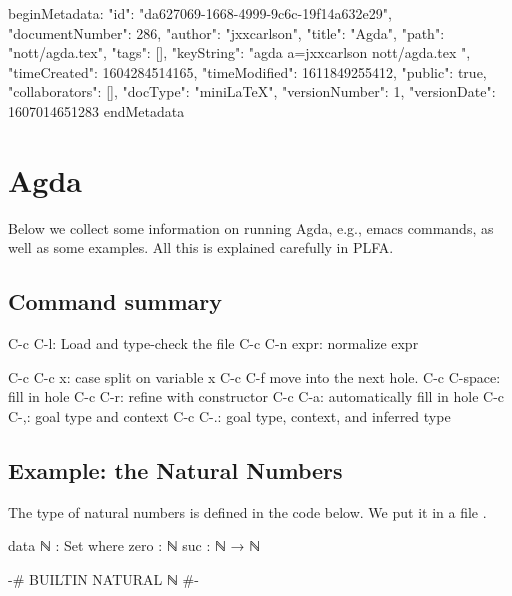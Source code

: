 beginMetadata:
{
    "id": "da627069-1668-4999-9c6c-19f14a632e29",
    "documentNumber": 286,
    "author": "jxxcarlson",
    "title": "Agda",
    "path": "nott/agda.tex",
    "tags": [],
    "keyString": "agda a=jxxcarlson nott/agda.tex ",
    "timeCreated": 1604284514165,
    "timeModified": 1611849255412,
    "public": true,
    "collaborators": [],
    "docType": "miniLaTeX",
    "versionNumber": 1,
    "versionDate": 1607014651283
}
endMetadata



\setcounter{section}{3}

\section{Agda}

\innertableofcontents



Below we collect some information on running Agda, e.g., emacs commands, as well as some examples.  All this is explained carefully in PLFA.

\subsection{Command summary}

\begin{colored}[bash]
C-c C-l: Load and type-check the file
C-c C-n expr: normalize expr

C-c C-c x: case split on variable x
C-c C-f move into the next hole.
C-c C-space: fill in hole
C-c C-r: refine with constructor
C-c C-a: automatically fill in hole
C-c C-,: goal type and context
C-c C-.: goal type, context, and inferred type
\end{colored}


\subsection{Example: the Natural Numbers}

The type of natural numbers is defined in the code below.  We put it in a file .

\begin{colored}[elm]
data ℕ : Set where
    zero : ℕ
    suc  : ℕ → ℕ
  
{-# BUILTIN NATURAL ℕ #-}
\end{colored}

